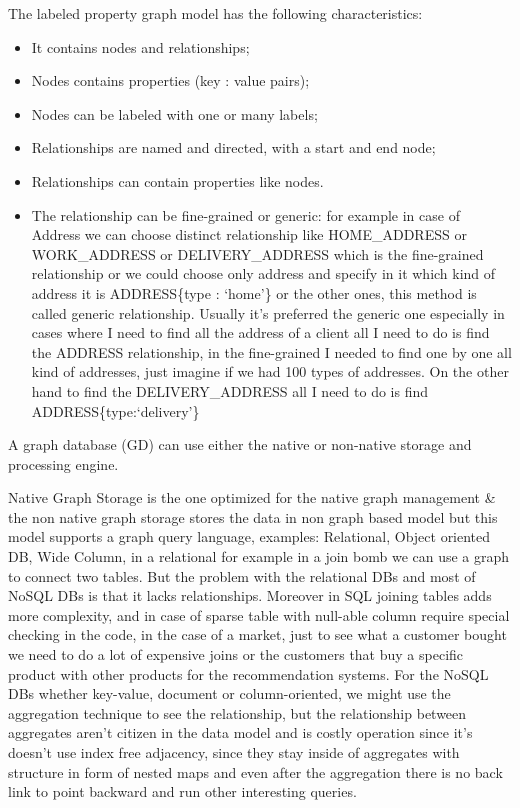 \documentclass[a4page, 11pt]{article}
\begin{document}
The labeled property graph model has the following characteristics:

\begin{itemize}[noitemsep]
	 
	\item
	It contains nodes and relationships;
	\item
	Nodes contains properties (key : value pairs);
	\item
	Nodes can be labeled with one or many labels;
	\item
	Relationships are named and directed, with a start and end node;
	\item
	Relationships can contain properties like nodes.
	\item
	The relationship can be fine-grained or generic: for example in case of Address we can choose distinct relationship like HOME\_ADDRESS or WORK\_ADDRESS or DELIVERY\_ADDRESS which is the fine-grained relationship or we could choose only address and specify in it which kind of address it is ADDRESS\{type : `home'\} or the other ones, this method is called generic relationship. Usually it's preferred the generic one especially in cases where I need to find all the address of a client all I need to do is find the ADDRESS relationship, in the fine-grained I needed to find one by one all kind of addresses, just	imagine if we had 100 types of addresses. On the other hand to find the DELIVERY\_ADDRESS all I need to do is find ADDRESS\{type:`delivery'\} 
\end{itemize}

A graph database (GD) can use either the native or non-native storage and processing engine.

Native Graph Storage is the one optimized for the native graph management \& the non native graph storage stores the data in non graph based model but this model supports a graph query language, examples: Relational, Object oriented DB, Wide Column, in a relational for example in a join bomb we can use a graph to connect two tables. But the problem
with the relational DBs and most of NoSQL DBs is that it lacks relationships.
Moreover in SQL joining tables adds more complexity, and in case of sparse table with null-able column require special checking in the code, in the case of a market, just to see what a customer bought we need to do a lot of expensive joins or the customers that buy a specific product with other products for the recommendation systems. 
For the NoSQL DBs whether key-value, document or column-oriented, we might use the aggregation technique to see the relationship, but the relationship between aggregates aren't citizen in the data model and is
costly operation since it's doesn't use index free adjacency, since they stay inside of aggregates with structure in form of nested maps and even after the aggregation there is no back link to point backward and run
other interesting queries.
\end{document}
